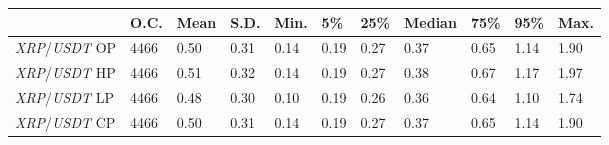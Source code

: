 \begin{tabular}{lllllllllll}
\toprule
 & \textbf{O.C.} & \textbf{Mean} & \textbf{S.D.} & \textbf{Min.} & \textbf{5\%} & \textbf{25\%} & \textbf{Median} & \textbf{75\%} & \textbf{95\%} & \textbf{Max.} \\
\midrule
\emph{XRP}/\emph{USDT} OP & 4466 & 0.50 & 0.31 & 0.14 & 0.19 & 0.27 & 0.37 & 0.65 & 1.14 & 1.90 \\
\emph{XRP}/\emph{USDT} HP & 4466 & 0.51 & 0.32 & 0.14 & 0.19 & 0.27 & 0.38 & 0.67 & 1.17 & 1.97 \\
\emph{XRP}/\emph{USDT} LP & 4466 & 0.48 & 0.30 & 0.10 & 0.19 & 0.26 & 0.36 & 0.64 & 1.10 & 1.74 \\
\emph{XRP}/\emph{USDT} CP & 4466 & 0.50 & 0.31 & 0.14 & 0.19 & 0.27 & 0.37 & 0.65 & 1.14 & 1.90 \\
\bottomrule
\end{tabular}
